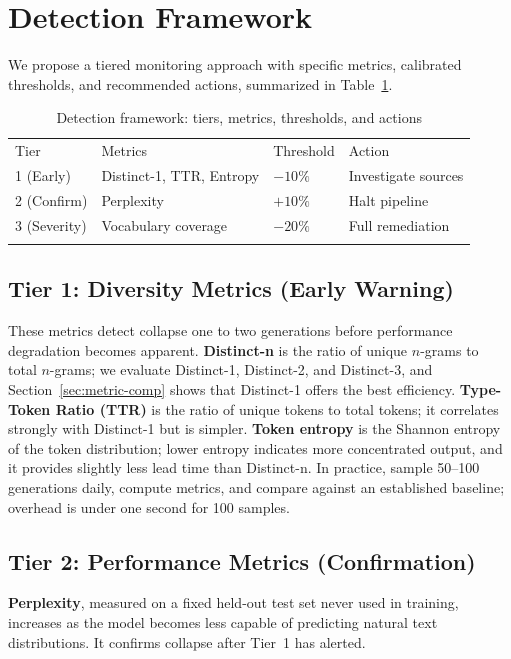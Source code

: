 \documentclass{svproc}
\newcommand{\dist}[1]{Distinct-#1}
\begin{document}
\section{Detection Framework}\label{sec:framework}
We propose a tiered monitoring approach with specific metrics, calibrated
thresholds, and recommended actions, summarized in Table~\ref{tab:framework}.

\begin{table}[t]
\centering
\caption{Detection framework: tiers, metrics, thresholds, and actions}
\label{tab:framework}
\begin{tabular}{llll}
\hline\noalign{\smallskip}
Tier & Metrics & Threshold & Action \\
\noalign{\smallskip}\hline\noalign{\smallskip}
1 (Early)   & \dist{1}, TTR, Entropy & $-10\%$ & Investigate sources \\
2 (Confirm) & Perplexity             & $+10\%$ & Halt pipeline       \\
3 (Severity)& Vocabulary coverage    & $-20\%$ & Full remediation    \\
\noalign{\smallskip}\hline
\end{tabular}
\end{table}

\subsection{Tier 1: Diversity Metrics (Early Warning)}
These metrics detect collapse one to two generations before performance
degradation becomes apparent. \textbf{\dist{n}} is the ratio of unique $n$-grams to
total $n$-grams; we evaluate \dist{1}, \dist{2}, and \dist{3}, and
Section~\ref{sec:metric-comp} shows that \dist{1} offers the best efficiency.
\textbf{Type-Token Ratio (TTR)} is the ratio of unique tokens to total tokens; it
correlates strongly with \dist{1} but is simpler. \textbf{Token entropy} is the
Shannon entropy of the token distribution; lower entropy indicates more
concentrated output, and it provides slightly less lead time than \dist{n}.
In practice, sample 50--100 generations daily, compute metrics, and compare against
an established baseline; overhead is under one second for 100 samples.

\subsection{Tier 2: Performance Metrics (Confirmation)}
\textbf{Perplexity}, measured on a fixed held-out test set never used in training,
increases as the model becomes less capable of predicting natural text
distributions. It confirms collapse after Tier~1 has alerted.
\end{document}

